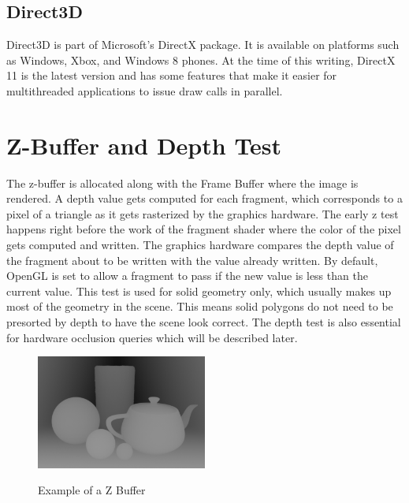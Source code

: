\documentclass[12pt]{ucthesis}
\newcommand{\captionfonts}{\small\bf\ssp}
\begin{document}
\subsection{Direct3D}
\label{direct3d}

Direct3D is part of Microsoft's DirectX package.\cite{about-direct3D}
It is available on platforms such as Windows, Xbox, and Windows 8 phones.
At the time of this writing, DirectX 11 is the latest version and has some features that make it easier for multithreaded applications to issue draw calls in parallel.\cite{d3d11-parallel}

\section{Z-Buffer and Depth Test}
\label{z-buffer-and-depth-test}

The z-buffer is allocated along with the Frame Buffer where the image is rendered.
A depth value gets computed for each fragment, which corresponds to a pixel of a triangle as it gets rasterized by the graphics hardware.
The early z test happens right before the work of the fragment shader where the color of the pixel gets computed and written.\cite{d3d11-pipeline}
The graphics hardware compares the depth value of the fragment about to be written with the value already written.
By default, OpenGL is set to allow a fragment to pass if the new value is less than the current value.\cite{gl-depth-func}
This test is used for solid geometry only, which usually makes up most of the geometry in the scene.
This means solid polygons do not need to be presorted by depth to have the scene look correct.
The depth test is also essential for hardware occlusion queries which will be described later.

\begin{figure}
\begin{center}
\includegraphics[width=0.5\textwidth]{Images/Z_buffer.png}
\captionfonts
\caption[Z Buffer]{Example of a Z Buffer}
\label{fig:z-buffer}
\end{center}
\end{figure}
\end{document}
